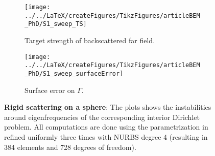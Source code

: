 \begin{figure}
	\centering
	\begin{subfigure}[t]{\textwidth}
		\texttt{[image: ../../LaTeX/createFigures/TikzFigures/articleBEM\_PhD/S1\_sweep\_TS]}
		\caption{Target strength of backscattered far field.}
		\label{Fig3:eigenFreqDirichlet}
	\end{subfigure} 
	\par\bigskip
	\par\bigskip
	\begin{subfigure}[t]{\textwidth}
		\texttt{[image: ../../LaTeX/createFigures/TikzFigures/articleBEM\_PhD/S1\_sweep\_surfaceError]}
		\caption{Surface error on $\Gamma$.}
		\label{Fig3:eigenFreqDirichletError}
	\end{subfigure} 
	\caption{\textbf{Rigid scattering on a sphere}: The plots shows the instabilities around eigenfrequencies of the corresponding interior Dirichlet problem. All computations are done using the parametrization in  refined uniformly three times with NURBS degree 4 (resulting in 384 elements and 728 degrees of freedom).}
\end{figure}

